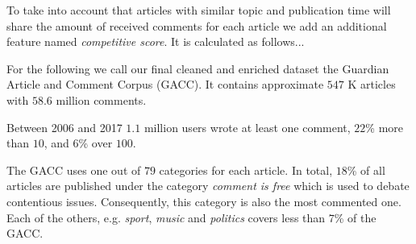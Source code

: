 To take into account that articles with similar topic and publication time will share the amount of received comments for each article we add an additional feature named \textit{competitive score}. It is calculated as follows...

For the following we call our final cleaned and enriched dataset the Guardian Article and Comment Corpus (GACC). It contains approximate $547$ K articles with $58.6$ million comments. 

Between 2006 and 2017 $1.1$ million users wrote at least one comment, $22$\% more than $10$, and $6$\% over $100$.

The GACC uses one out of $79$ categories for each article. In total, $18$\% of all articles are published under the category \textit{comment is free} which is used to debate contentious issues. Consequently, this category is also the most commented one. 
Each of the others, e.g. \textit{sport}, \textit{music} and \textit{politics} covers less than $7$\% of the GACC.


